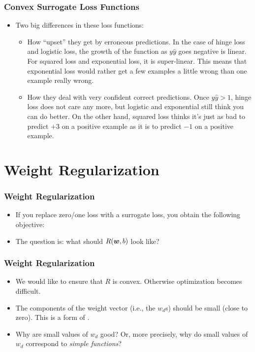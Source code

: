\documentclass[trans]{beamer}
\begin{document}
\begin{frame}
  \frametitle{Convex Surrogate Loss Functions}
\begin{itemize}
\item
Two big differences in these loss functions:
\begin{itemize}
\item How ``upset'' they get by erroneous predictions.  In the
case of hinge loss and logistic loss, the growth of the function as
$y\hat y$ goes negative is linear.  For squared loss and exponential
loss, it is super-linear.  This means that exponential loss would
rather get a few examples a little wrong than one example really
wrong. 
\item How they deal with very confident
correct predictions.  Once $y\hat y>1$, hinge loss does not care any
more, but logistic and exponential still think you can do better.  On
the other hand, squared loss thinks it's just as bad to predict $+3$
on a positive example as it is to predict $-1$ on a positive example.
\end{itemize}
\end{itemize}
\end{frame}

\section{Weight Regularization}

\begin{frame}
  \frametitle{Weight Regularization}
\begin{itemize}
\item
If you replace  zero/one loss with a
surrogate loss, you obtain the following objective:
%
%
\item The question is: what should $R({\boldsymbol{w}},b)$ look like?
\end{itemize}
\end{frame}

\begin{frame}
  \frametitle{Weight Regularization}
\begin{itemize}
\item
We would like to
ensure that $R$ is convex.  Otherwise  optimization becomes difficult.
\item The components of the weight vector (i.e., the $w_d$s) should be
small (close to zero).  This is a form of .
\item 
Why are small values of $w_d$ good?  Or, more precisely, why do small
values of $w_d$ correspond to \emph{simple functions}? 
\end{itemize}
\end{frame}
\end{document}

